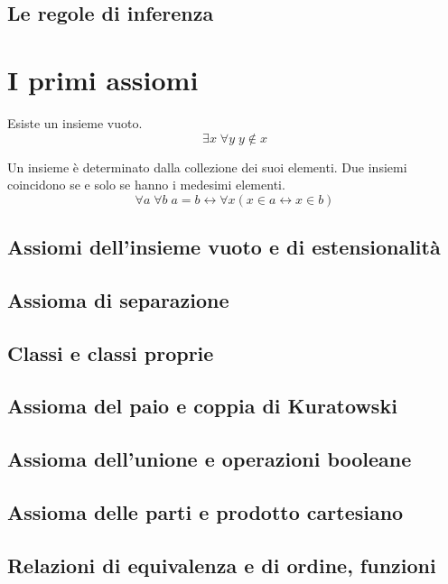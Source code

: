 \documentclass[11pt]{scrartcl}
\begin{document}
\subsection{Le regole di inferenza}



\newpage
\section{I primi assiomi}
\begin{axiom}
Esiste un insieme vuoto.
\[ \exists x \; \forall y \; y \not\in x
		\]
\end{axiom}

\begin{axiom}
Un insieme è determinato dalla collezione dei suoi elementi. Due insiemi coincidono se e solo se hanno i medesimi elementi.
\[ \forall a \; \forall b \; a = b \longleftrightarrow \forall x (x \in a \longleftrightarrow x \in b)
	\]
\end{axiom}

\subsection{Assiomi dell'insieme vuoto e di estensionalità}
\newpage
\subsection{Assioma di separazione}
\newpage
\subsection{Classi e classi proprie}
\newpage
\subsection{Assioma del paio e coppia di Kuratowski}
\newpage
\subsection{Assioma dell'unione e operazioni booleane}
\newpage
\subsection{Assioma delle parti e prodotto cartesiano}
\newpage
\subsection{Relazioni di equivalenza e di ordine, funzioni}
\end{document}
